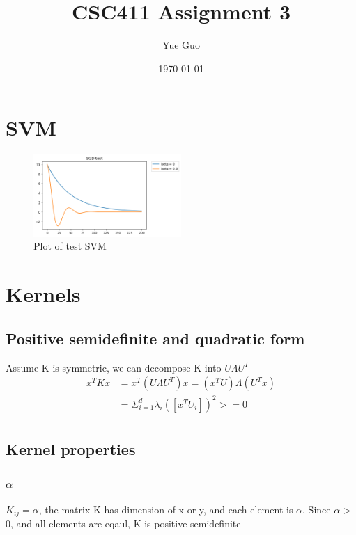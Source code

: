 \documentclass[letterpaper, 12]{article}
\date{\today}
\title{CSC411 Assignment 3}
\author{Yue Guo}
\begin{document}
\maketitle


\section{SVM}
\begin{figure}[H]
\centering
\includegraphics[width=0.5\textwidth]{q2part1plot.png}
\caption{\label{}Plot of test SVM}
\end{figure}


\section{Kernels}
\subsection{Positive semidefinite and quadratic form}
Assume K is symmetric, we can decompose K into $U \Lambda U^T$
\begin{equation*}
\begin{split}
x^T K x &= x^T (U \Lambda U^T) x = (x^T U) \Lambda (U^T x)\\
&= \Sigma_{i =1}^{d} \lambda_{i} ([x^T U_{i}])^2 >= 0\\
\end{split}
\end{equation*}

\subsection{Kernel properties}
\subsubsection{$\alpha$}
 $K_{ij} = \alpha $, the matrix K has dimension of x or y, and each element is $\alpha$. Since $\alpha$ > 0, and all elements are eqaul, K is positive semidefinite
 
\end{document}
